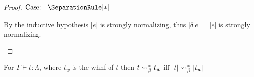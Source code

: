 \begin{proof}
    $\text{Case: }\begin{array}{c} \SeparationRule[*] \end{array}$
    \begin{proofcase}
        By the inductive hypothesis $|e|$ is strongly normalizing, thus $|\delta\ e| = |e|$ is strongly normalizing.
    \end{proofcase}

\end{proof}


\begin{lemma}
    For $\Gamma \vdash t : A$, where $t_w$ is the whnf of $t$ then $t \rightsquigarrow_\beta^* t_w$ iff $|t| \rightsquigarrow_\beta^* |t_w|$
\end{lemma}
